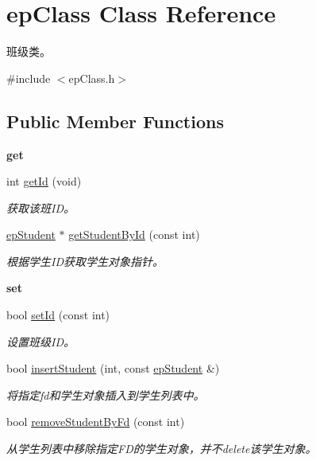 \hypertarget{classepClass}{\section{ep\-Class \-Class \-Reference}
\label{classepClass}
}


班级类。  




{\ttfamily \#include $<$ep\-Class.\-h$>$}

\subsection*{\-Public \-Member \-Functions}
\begin{Indent}{\bf get}\par
\begin{DoxyCompactItemize}
\item 
int \hyperlink{classepClass_ad046b8da701570ac5fc6555334791479}{get\-Id} (void)
\begin{DoxyCompactList}\small\item\em 获取该班\-I\-D。 \end{DoxyCompactList}\item 
\hyperlink{classepStudent}{ep\-Student} $\ast$ \hyperlink{classepClass_ab660664c8325c0f4b2e76c1240cf2484}{get\-Student\-By\-Id} (const int)
\begin{DoxyCompactList}\small\item\em 根据学生\-I\-D获取学生对象指针。 \end{DoxyCompactList}\end{DoxyCompactItemize}
\end{Indent}
\begin{Indent}{\bf set}\par
\begin{DoxyCompactItemize}
\item 
bool \hyperlink{classepClass_a39c8de9501208e885d16ccaf22b58832}{set\-Id} (const int)
\begin{DoxyCompactList}\small\item\em 设置班级\-I\-D。 \end{DoxyCompactList}\item 
bool \hyperlink{classepClass_a63f8bb1c238b409de7e1207dcc457c31}{insert\-Student} (int, const \hyperlink{classepStudent}{ep\-Student} \&)
\begin{DoxyCompactList}\small\item\em 将指定fd和学生对象插入到学生列表中。 \end{DoxyCompactList}\item 
bool \hyperlink{classepClass_a2d49b91d2c101ad8525082486842fa5f}{remove\-Student\-By\-Fd} (const int)
\begin{DoxyCompactList}\small\item\em 从学生列表中移除指定\-F\-D的学生对象，并不delete该学生对象。 \end{DoxyCompactList}\end{DoxyCompactItemize}
\end{Indent}
